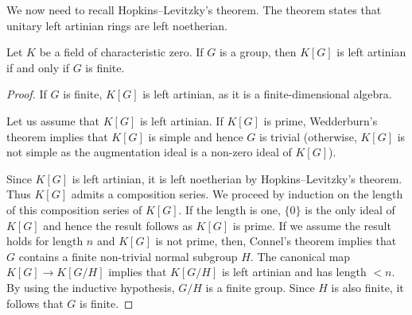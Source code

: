 We now need to recall Hopkins--Levitzky's theorem. The theorem
states that unitary left artinian rings are left noetherian.

\begin{theorem}[Connel]
	Let $K$ be a field of characteristic zero. If $G$ is a group, then 
	$K[G]$ is left artinian if and only if $G$ is finite.
\end{theorem}

\begin{proof}
	If $G$ is finite, $K[G]$ is left artinian, as it is a finite-dimensional algebra.
	
	Let us assume that $K[G]$ is left artinian. 
	If $K[G]$ is prime, Wedderburn's theorem implies that 
	$K[G]$ is simple and hence 
	$G$ is trivial (otherwise, $K[G]$ is not simple as the augmentation ideal 
	is a non-zero ideal of $K[G]$).

	Since $K[G]$ is left artinian, it is left noetherian by Hopkins--Levitzky's theorem. Thus $K[G]$
	admits a composition series. We proceed by induction on the length of this composition series of 
	$K[G]$. If the length is one, $\{0\}$ is the only ideal of $K[G]$ and hence the result follows as 
	$K[G]$ is prime. If we assume the result holds for length $n$ and $K[G]$ is not prime, then, 
	Connel's theorem implies that $G$ contains a finite non-trivial normal subgroup $H$. The canonical map
	$K[G]\to K[G/H]$ implies that $K[G/H]$ is left artinian and has length 
	$<n$. By using the inductive hypothesis, $G/H$
	is a finite group. Since $H$ is also finite, it follows that $G$ is finite. 
\end{proof}

